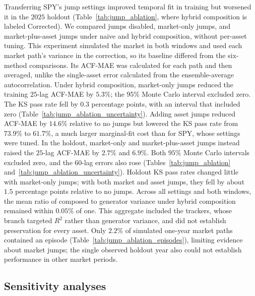 Transferring SPY's jump settings improved temporal fit in training
but worsened it in the $2025$ holdout
(Table~\ref{tab:jump_ablation}, where hybrid composition is labeled
Corrected). We compared jumps disabled, market-only jumps, and
market-plus-asset jumps under naive and hybrid composition, without
per-asset tuning. This experiment simulated the market in both
windows and used each market path's variance in the correction, so
its baseline differed from the six-method comparisons. Its ACF-MAE
was calculated for each path and then averaged, unlike the
single-asset error calculated from the ensemble-average
autocorrelation. Under hybrid composition, market-only jumps reduced
the training $25$-lag ACF-MAE by $5.3\%$; the $95\%$ Monte Carlo
interval excluded zero. The KS pass rate fell by $0.3$ percentage
points, with an interval that included zero
(Table~\ref{tab:jump_ablation_uncertainty}). Adding asset jumps
reduced ACF-MAE by $14.6\%$ relative to no jumps but lowered the KS
pass rate from $73.9\%$ to $61.7\%$, a much larger marginal-fit
cost than for SPY, whose settings were tuned. In the holdout,
market-only and market-plus-asset jumps instead raised the $25$-lag
ACF-MAE by $2.7\%$ and $6.9\%$. Both $95\%$ Monte Carlo
intervals excluded zero, and the $60$-lag errors also rose
(Tables~\ref{tab:jump_ablation}
and~\ref{tab:jump_ablation_uncertainty}). Holdout KS pass rates
changed little with market-only jumps; with both market and asset
jumps, they fell by about $1.5$ percentage points relative to no jumps. Across all settings
and both windows, the mean ratio of composed to generator variance
under hybrid composition remained within $0.05\%$ of one. This
aggregate included the trackers, whose branch targeted $R^2$ rather
than generator variance, and did not establish preservation for every
asset. Only $2.2\%$ of simulated one-year market paths contained an
episode (Table~\ref{tab:jump_ablation_episodes}), limiting evidence
about market jumps; the single observed holdout year also could not
establish performance in other market periods.


\subsection{Sensitivity analyses}

